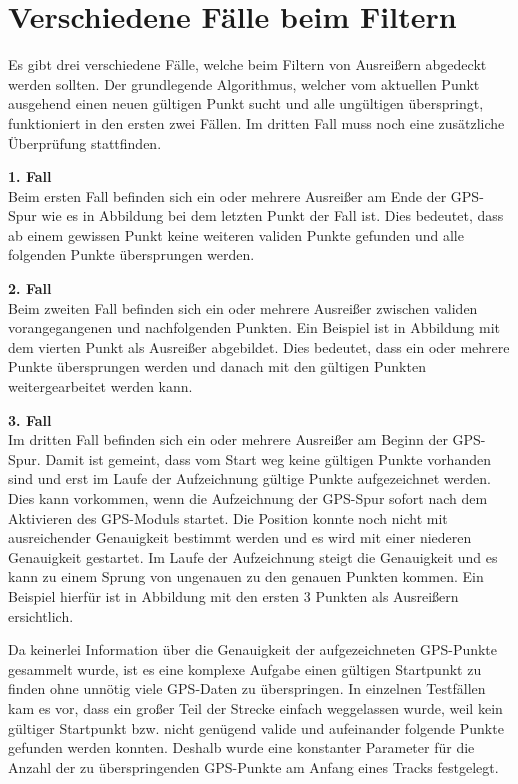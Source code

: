 \section*{Verschiedene Fälle beim Filtern}
Es gibt drei verschiedene Fälle, welche beim Filtern von Ausreißern abgedeckt werden sollten. Der grundlegende Algorithmus, welcher vom aktuellen Punkt ausgehend einen neuen gültigen Punkt sucht und alle ungültigen überspringt, funktioniert in den ersten zwei Fällen. Im dritten Fall muss noch eine zusätzliche Überprüfung stattfinden.

\textbf{1. Fall}\\
Beim ersten Fall befinden sich ein oder mehrere Ausreißer am Ende der GPS-Spur wie es in Abbildung  bei dem letzten Punkt der Fall ist. Dies bedeutet, dass ab einem gewissen Punkt keine weiteren validen Punkte gefunden und alle folgenden Punkte übersprungen werden.


\textbf{2. Fall}\\
Beim zweiten Fall befinden sich ein oder mehrere Ausreißer zwischen validen vorangegangenen und nachfolgenden Punkten. Ein Beispiel ist in Abbildung  mit dem vierten Punkt als Ausreißer abgebildet. Dies bedeutet, dass ein oder mehrere Punkte übersprungen werden und danach mit den gültigen Punkten weitergearbeitet werden kann.


\textbf{3. Fall}\\
Im dritten Fall befinden sich ein oder mehrere Ausreißer am Beginn der GPS-Spur. Damit ist gemeint, dass vom Start weg keine gültigen Punkte vorhanden sind und erst im Laufe der Aufzeichnung gültige Punkte aufgezeichnet werden. Dies kann vorkommen, wenn die Aufzeichnung der GPS-Spur sofort nach dem Aktivieren des GPS-Moduls startet. Die Position konnte noch nicht mit ausreichender Genauigkeit bestimmt werden und es wird mit einer niederen Genauigkeit gestartet. Im Laufe der Aufzeichnung steigt die Genauigkeit und es kann zu einem Sprung von ungenauen zu den genauen Punkten kommen. Ein Beispiel hierfür ist in Abbildung  mit den ersten 3 Punkten als Ausreißern ersichtlich.


Da keinerlei Information über die Genauigkeit der aufgezeichneten GPS-Punkte gesammelt wurde, ist es eine komplexe Aufgabe einen gültigen Startpunkt zu finden ohne unnötig viele GPS-Daten zu überspringen. In einzelnen Testfällen kam es vor, dass ein großer Teil der Strecke einfach weggelassen wurde, weil kein gültiger Startpunkt bzw. nicht genügend valide und aufeinander folgende Punkte gefunden werden konnten. Deshalb wurde eine konstanter Parameter für die Anzahl der zu überspringenden GPS-Punkte am Anfang eines Tracks festgelegt.

